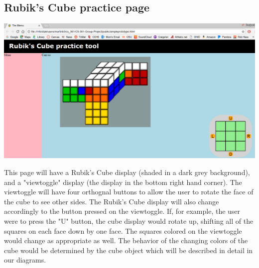 \documentclass[12pt]{article}
\begin{document}
	\subsection{Rubik's Cube practice page}
	\includegraphics[width = \textwidth]{cubepage.PNG}
	\par
	This page will have a Rubik's Cube display (shaded in a dark grey background), and a "viewtoggle" display (the display in the bottom right hand corner). The viewtoggle will have four orthognal buttons to allow the user to rotate the face of the cube to see other sides. The Rubik's Cube display will also change accordingly to the button pressed on the viewtoggle. If, for example, the user were to press the "U" button, the cube display would rotate up, shifting all of the squares on each face down by one face. The squares colored on the viewtoggle would change as appropriate as well. The behavior of the changing colors of the cube would be determined by the cube object which will be described in detail in our diagrams. \\
	
\end{document}
